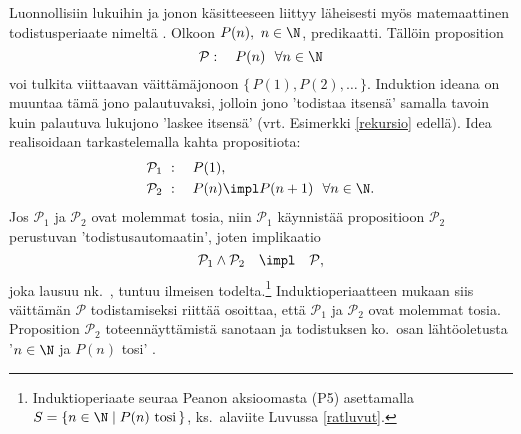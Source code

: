 Luonnollisiin lukuihin ja jonon käsitteeseen liittyy läheisesti myös matemaattinen 
todistusperiaate nimeltä . Olkoon $P(n),\ n \in \N$, predikaatti. Tällöin 
proposition
\[
\mathcal{P}: \quad P(n)\ \ \forall n \in \N
\]
voi tulkita viittaavan väittämäjonoon $\{\,P(1),P(2), \ldots\,\}$. Induktion ideana on muuntaa
tämä jono palautuvaksi, jolloin jono 'todistaa itsensä' samalla tavoin kuin palautuva lukujono
'laskee itsensä' (vrt. Esimerkki \ref{rekursio} edellä). Idea realisoidaan tarkastelemalla
kahta propositiota:
\begin{align*}
&\mathcal{P}_1\ : \quad P(1), \\
&\mathcal{P}_2\ : \quad P(n) \impl P(n+1)\ \ \forall n \in \N.
\end{align*}
Jos $\mathcal{P}_1$ ja $\mathcal{P}_2$ ovat molemmat tosia, niin $\mathcal{P}_1$ käynnistää 
propositioon $\mathcal{P}_2$ perustuvan 'todistusautomaatin', joten implikaatio
\[
\mathcal{P}_1 \wedge \mathcal{P}_2 \quad \impl \quad \mathcal{P},
\]
joka lausuu nk.\ , tuntuu ilmeisen 
todelta.\footnote[2]{Induktioperiaate seuraa Peanon aksioomasta (P5) asettamalla
$S = \{n \in \N \mid P(n)\ \text{tosi}\,\}$, ks.\ alaviite Luvussa \ref{ratluvut}.} 
Induktioperiaatteen mukaan siis väittämän $\mathcal{P}$ todistamiseksi riittää osoittaa, että
$\mathcal{P}_1$ ja $\mathcal{P}_2$ ovat molemmat tosia. Proposition $\mathcal{P}_2$ 
%
toteennäyttämistä sanotaan  ja todistuksen ko.\ osan lähtöoletusta 
'$n \in \N$ ja $P(n)$ tosi' .

